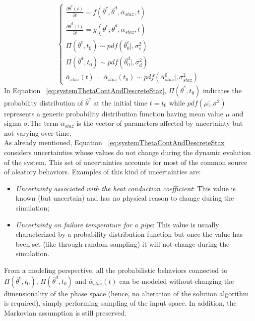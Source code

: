 \begin{equation}
\label{eq:systemThetaContAndDescreteStaz}
\left\{\begin{matrix}
\frac{\partial  \overline{\theta}^{c}\left ( t \right )}{\partial t}=f\left ( \overline{\theta}^{c},\overline{\theta}^{d}, \overline{\alpha}_{staz} ,      t \right ) \\ 
\frac{\partial  \overline{\theta}^{d}\left ( t \right )}{\partial t}=g\left ( \overline{\theta}^{c},\overline{\theta}^{d},\overline{\alpha}_{staz},t \right )\\
\Pi \left ( \overline{\theta}^{c},t_{0} \right ) \sim pdf\left ( \overline{\theta}^{c}_{0}|,\sigma_{c}^{2} \right )\\ 
\Pi \left ( \overline{\theta}^{d},t_{0} \right ) \sim pdf\left ( \overline{\theta}^{d}_{0}|,\sigma_{d}^{2} \right ) \\
\overline{\alpha}_{staz}\left ( t \right )=\overline{\alpha}_{staz}\left ( t_{0} \right ) \sim pdf\left ( \overline{\alpha}_{staz}^{0}|, \sigma_{staz}^{2} \right )
\end{matrix}\right.
\end{equation}
In Equation ~\ref{eq:systemThetaContAndDescreteStaz}, $\Pi \left ( \overline{\theta}^{c},t_{0} \right )$ indicates the 
probability distribution of $\overline{\theta}^{c}$ at the initial time $t=t_{0}$ while
$pdf\left ( \mu|, \sigma^{2} \right )$ represents a generic probability distribution function having mean value 
$\mu$ and sigma $\sigma$.The term $\overline{\alpha}_{staz}$ is the vector of parameters affected by 
uncertainty but not varying over time.
\\As already mentioned, Equation ~\ref{eq:systemThetaContAndDescreteStaz} considers uncertainties whose values
do not change during the dynamic evolution of the system. This set of uncertainties accounts for most of the 
common source of aleatory behaviors. Examples of this kind of uncertainties are:
\begin{itemize}
  \item \textit{Uncertainty associated with the heat conduction coefficient}:  This value is known (but uncertain) and has no physical reason to change during the simulation;
  \item \textit{Uncertainty on failure temperature for a pipe}: This value is usually characterized by a probability distribution function but once the value has been set (like through random sampling) it will not change during the simulation.
\end{itemize}
From a modeling perspective, all the probabilistic behaviors connected to $\Pi \left ( \overline{\theta}^{c},t_{0} 
\right ) $, $\Pi \left ( \overline{\theta}^{d},t_{0} \right )$ and $\overline{\alpha}_{staz}(t)$ can be modeled without 
changing the dimensionality of the phase space (hence, no alteration of the solution algorithm is required), simply performing sampling of the input space. In addition, the Markovian assumption is still preserved.

